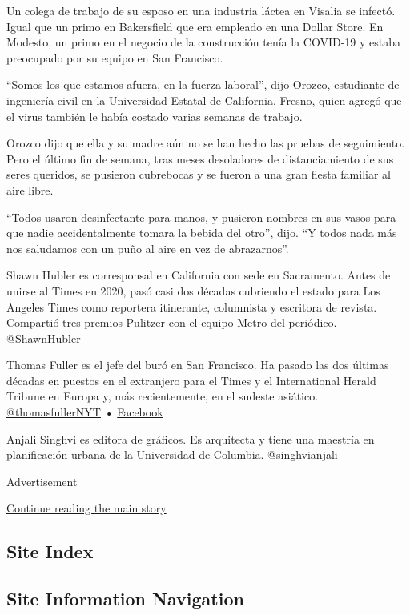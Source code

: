 Un colega de trabajo de su esposo en una industria láctea en Visalia se
infectó. Igual que un primo en Bakersfield que era empleado en una
Dollar Store. En Modesto, un primo en el negocio de la construcción
tenía la COVID-19 y estaba preocupado por su equipo en San Francisco.

``Somos los que estamos afuera, en la fuerza laboral'', dijo Orozco,
estudiante de ingeniería civil en la Universidad Estatal de California,
Fresno, quien agregó que el virus también le había costado varias
semanas de trabajo.

Orozco dijo que ella y su madre aún no se han hecho las pruebas de
seguimiento. Pero el último fin de semana, tras meses desoladores de
distanciamiento de sus seres queridos, se pusieron cubrebocas y se
fueron a una gran fiesta familiar al aire libre.

``Todos usaron desinfectante para manos, y pusieron nombres en sus vasos
para que nadie accidentalmente tomara la bebida del otro'', dijo. ``Y
todos nada más nos saludamos con un puño al aire en vez de abrazarnos''.

Shawn Hubler es corresponsal en California con sede en Sacramento. Antes
de unirse al Times en 2020, pasó casi dos décadas cubriendo el estado
para Los Angeles Times como reportera itinerante, columnista y escritora
de revista. Compartió tres premios Pulitzer con el equipo Metro del
periódico. \href{https://twitter.com/ShawnHubler}{@ShawnHubler}

Thomas Fuller es el jefe del buró en San Francisco. Ha pasado las dos
últimas décadas en puestos en el extranjero para el Times y el
International Herald Tribune en Europa y, más recientemente, en el
sudeste asiático.
\href{https://twitter.com/thomasfullerNYT}{@thomasfullerNYT} •
\href{https://www.facebookcorewwwi.onion/thomas.fuller.9889}{Facebook}

Anjali Singhvi es editora de gráficos. Es arquitecta y tiene una
maestría en planificación urbana de la Universidad de Columbia.
\href{https://twitter.com/singhvianjali}{@singhvianjali}

Advertisement

\protect\hyperlink{after-bottom}{Continue reading the main story}

\hypertarget{site-index}{%
\subsection{Site Index}\label{site-index}}

\hypertarget{site-information-navigation}{%
\subsection{Site Information
Navigation}\label{site-information-navigation}}

